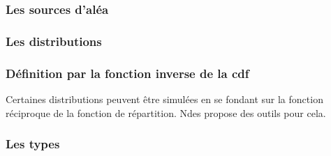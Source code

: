 \subsubsection{Les sources d'aléa}

%
\subsubsection{Les distributions}

%
\subsubsection{Définition par la fonction inverse de la {\sc cdf}}

   Certaines distributions peuvent être simulées en se fondant sur la
fonction réciproque de la fonction  de répartition. {\sc Ndes} propose
des outils pour cela.

%
\subsubsection{Les types}
